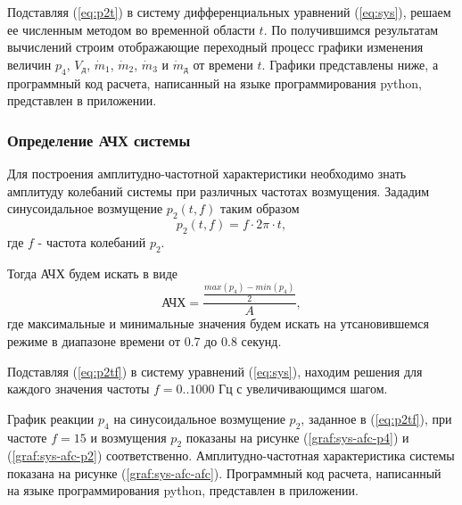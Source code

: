 Подставляя (\ref{eq:p2t}) в систему дифференциальных уравнений (\ref{eq:sys}), решаем ее численным методом во временной области $t$. По получившимся результатам вычислений строим отображающие переходный процесс графики изменения величин $p_4$, $V_{\text{д}}$, $\dot{m}_1$, $\dot{m}_2$, $\dot{m}_3$ и $\dot{m}_{\text{д}}$ от времени $t$. Графики представлены ниже, а программный код расчета, написанный на языке программирования python, представлен в приложении.



\subsubsection{Определение АЧХ системы}

Для построения амплитудно-частотной характеристики необходимо знать амплитуду колебаний системы при различных частотах возмущения. Зададим синусоидальное возмущение $p_2(t, f)$ таким образом
\begin{equation}
    p_2(t, f) = f \cdot 2\pi \cdot t,
    \label{eq:p2tf}
\end{equation}
где $f$ - частота колебаний $p_2$. 

Тогда АЧХ будем искать в виде
\begin{equation}
    \textit{АЧХ} = \frac{\frac{max(p_4)-min(p_4)}{2}}{A},
    \label{eq:afc}
\end{equation}
где максимальные и минимальные значения будем искать на утсановившемся режиме в диапазоне времени от 0.7 до 0.8 секунд. 

Подставляя (\ref{eq:p2tf}) в систему уравнений (\ref{eq:sys}), находим решения для каждого значения частоты $f = 0..1000$ Гц с увеличивающимся шагом.

График реакции $p_4$ на синусоидальное возмущение $p_2$, заданное в (\ref{eq:p2tf}), при частоте $f = 15$ и возмущения $p_2$ показаны на рисунке (\ref{graf:sys-afc-p4}) и (\ref{graf:sys-afc-p2}) соответственно. Амплитудно-частотная характеристика системы показана на рисунке (\ref{graf:sys-afc-afc}). Программный код расчета, написанный на языке программирования python, представлен в приложении.

